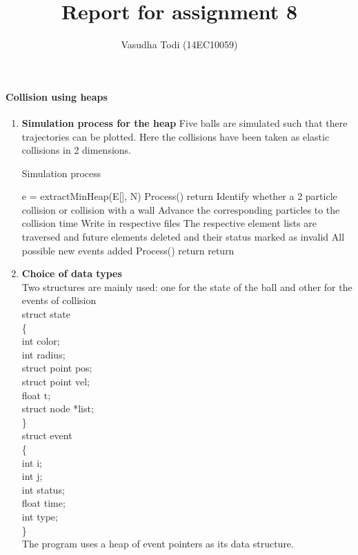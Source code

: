 \documentclass[a4paper,11pt]{article}
\title{Report for assignment 8}
\author{Vasudha Todi (14EC10059)}
\begin{document}
\maketitle


\paragraph{Collision using heaps}
\begin{enumerate}
 \item \textbf{Simulation process for the heap}
Five balls are simulated such that there trajectories can be plotted. Here the collisions have been taken as elastic collisions in 2 dimensions.

  \begin{algorithm}
    \caption{Simulation process}
    \begin{algorithmic}[1]
        \State e = extractMinHeap(E[], N)
            \State Process()
            \State return
        \EndIf
        \State Identify whether a 2 particle collision or collision with a wall
        \State Advance the corresponding particles to the collision time
        \State Write in respective files
        \State The respective element lists are traversed and future elements deleted and their status marked as invalid
        \State All possible new events added
        \State Process()
        \State return
    \EndIf
    \State return
    \end{algorithmic}
  \end{algorithm}

\item \textbf{Choice of data types}\\
Two structures are mainly used: one for the state of the ball and other for the events of collision\\
struct state\\
\{\\
        int color;\\
        int radius;\\
        struct point pos;\\
        struct point vel;\\
        float t;\\
        struct node *list;\\
\}\\

struct event\\
\{\\
       int i;\\
        int j;\\
        int status;\\
        float time;\\
        int type;\\
\}\\
The program uses a heap of event pointers as its data structure.\\


\end{enumerate}
\end{document}
